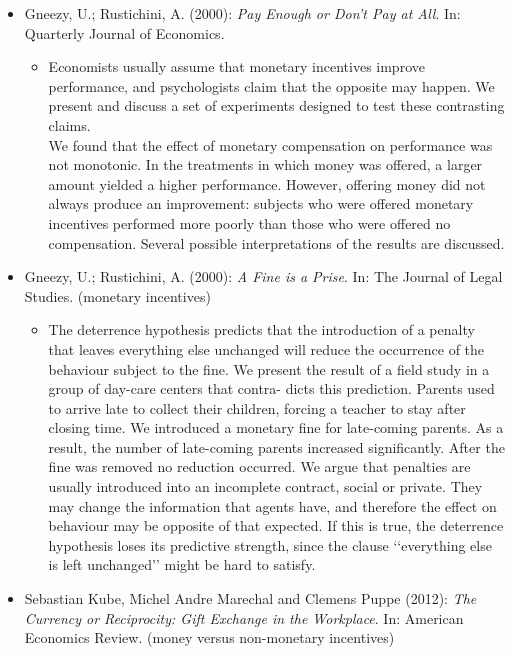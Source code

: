 \begin{itemize}
	\item Gneezy, U.; Rustichini, A. (2000): \textit{Pay Enough or Don't Pay at All}. In: Quarterly Journal of Economics.
		\begin{itemize}
			\item Economists usually assume that monetary incentives improve performance, and psychologists claim that the opposite may happen. We present and discuss a set of experiments designed to test these contrasting claims. \\
				We found that the effect of monetary compensation on performance was not monotonic. In the treatments in which money was offered, a larger amount yielded a higher performance. However, offering money did not always produce an improvement: subjects who were offered monetary incentives performed more poorly than those who were offered no compensation. Several possible interpretations of the results are discussed.
		\end{itemize}
	\item Gneezy, U.; Rustichini, A. (2000): \textit{A Fine is a Prise}. In: The Journal of Legal Studies. (monetary incentives)
		\begin{itemize}
			\item The deterrence hypothesis predicts that the introduction of a penalty that leaves everything else unchanged will reduce the occurrence of the behaviour subject to the fine. We present the result of a field study in a group of day-care centers that contra- dicts this prediction. Parents used to arrive late to collect their children, forcing a teacher to stay after closing time. We introduced a monetary fine for late-coming parents. As a result, the number of late-coming parents increased significantly. After the fine was removed no reduction occurred. We argue that penalties are usually introduced into an incomplete contract, social or private. They may change the information that agents have, and therefore the effect on behaviour may be opposite of that expected. If this is true, the deterrence hypothesis loses its predictive strength, since the clause ‘‘everything else is left unchanged’’ might be hard to satisfy.
		\end{itemize}
	\item Sebastian Kube, Michel Andre Marechal and Clemens Puppe (2012): \textit{The Currency or Reciprocity: Gift Exchange in the Workplace}. In: American Economics Review. (money versus non-monetary incentives)
		\begin{itemize}

\end{itemize}
\end{itemize}
